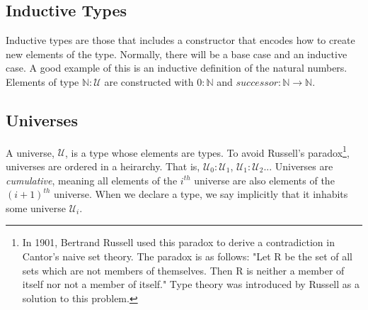 \documentclass[12pt]{report}
\begin{document}
\subsection{Inductive Types}
Inductive types are those that includes a constructor that encodes how to create new elements of the type. Normally, there will be a base case and an inductive case. A good example of this is an inductive definition of the natural numbers. Elements of type $\mathbb{N} : \mathcal{U} $ are constructed with $0 : \mathbb{N} $ and $successor : \mathbb{N} \rightarrow \mathbb{N}$.
\subsection{Universes}
A universe, $\mathcal{U}$, is a type whose elements are types. To avoid Russell's paradox\footnote{
In 1901, Bertrand Russell used this paradox to derive a contradiction in Cantor's naive set theory. The paradox is as follows: "Let R be the set of all sets which are not members of themselves. Then R is neither a member of itself nor not a member of itself."\cite{rp} Type theory was introduced by Russell as a solution to this problem.
}, universes are ordered in a heirarchy. That is, $\mathcal{U}_0 : \mathcal{U}_1$, $ \mathcal{U}_1 : \mathcal{U}_2$... Universes are \textit{cumulative}, meaning all elements of the $i^{th}$ universe are also elements of the $(i+1)^{th}$ universe. When we declare a type, we say implicitly that it inhabits some universe $\mathcal{U}_i$.
\end{document}
